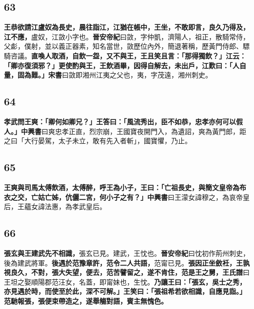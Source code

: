 \subsection*{63}

\textbf{王恭欲請江盧奴為長史，晨往詣江，江猶在帳中，王坐，不敢即言，良久乃得及，江不應，}{\footnotesize 盧奴，江敳小字也。\textbf{晉安帝紀}曰敳，字仲凱，濟陽人，祖正，散騎常侍，父虨，僕射，並以義正器素，知名當世，敳歷位內外，簡退著稱，歷黃門侍郎、驃騎咨議。}\textbf{直喚人取酒，自飲一盌，又不與王，王且笑且言：「那得獨飲？」江云：「卿亦復須邪？」更使酌與王，王飲酒畢，因得自解去，未出戶，江歎曰：「人自量，固為難。」}{\footnotesize \textbf{宋書}曰敳即湘州江夷之父也，夷，字茂遠，湘州刺史。}

\subsection*{64}

\textbf{孝武問王爽：「卿何如卿兄？」王答曰：「風流秀出，臣不如恭，忠孝亦何可以假人。」}{\footnotesize \textbf{中興書}曰爽忠孝正直，烈宗崩，王國寶夜開門入，為遺詔，爽為黃門郎，距之曰「大行晏駕，太子未立，敢有先入者斬」，國寶懼，乃止。}

\subsection*{65}

\textbf{王爽與司馬太傅飲酒，太傅醉，呼王為小子，王曰：「亡祖長史，與簡文皇帝為布衣之交，亡姑亡姊，伉儷二宮，何小子之有？」}{\footnotesize \textbf{中興書}曰王濛女諱穆之，為哀帝皇后，王蘊女諱法惠，為孝武皇后。}

\subsection*{66}

\textbf{張玄與王建武先不相識，}{\footnotesize 張玄已見。建武，王忱也。\textbf{晉安帝紀}曰忱初作荊州刺史，後為建武將軍。}\textbf{後遇於范豫章許，范令二人共語，}{\footnotesize 范甯已見。}\textbf{張因正坐斂衽，王孰視良久，不對，張大失望，便去，范苦譬留之，遂不肯住，范是王之舅，}{\footnotesize \textbf{王氏譜}曰王坦之娶順陽郡范汪女，名蓋，即甯妹也，生忱。}\textbf{乃讓王曰：「張玄，吳士之秀，亦見遇於時，而使至於此，深不可解。」王笑曰：「張祖希若欲相識，自應見詣。」范馳報張，張便束帶造之，遂舉觴對語，賓主無愧色。}